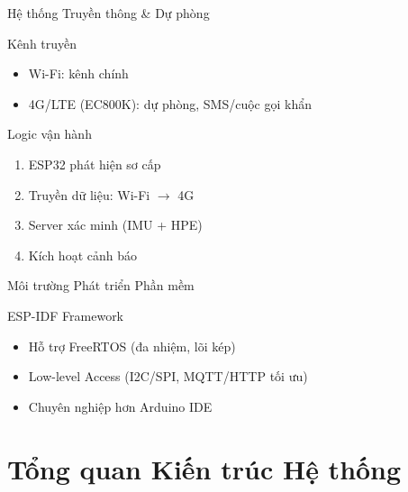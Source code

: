 \begin{frame}{Hệ thống Truyền thông \& Dự phòng}
\begin{block}{Kênh truyền}
\begin{itemize}
    \item Wi-Fi: kênh chính
    \item 4G/LTE (EC800K): dự phòng, SMS/cuộc gọi khẩn
\end{itemize}
\end{block}

\begin{alertblock}{Logic vận hành}
\begin{enumerate}
    \item ESP32 phát hiện sơ cấp
    \item Truyền dữ liệu: Wi-Fi $\to$ 4G
    \item Server xác minh (IMU + HPE)
    \item Kích hoạt cảnh báo
\end{enumerate}
\end{alertblock}
\end{frame}

\begin{frame}{Môi trường Phát triển Phần mềm}
\begin{block}{ESP-IDF Framework}
\begin{itemize}
    \item Hỗ trợ FreeRTOS (đa nhiệm, lõi kép)
    \item Low-level Access (I2C/SPI, MQTT/HTTP tối ưu)
    \item Chuyên nghiệp hơn Arduino IDE
\end{itemize}
\end{block}
\end{frame}

\section{Tổng quan Kiến trúc Hệ thống}

